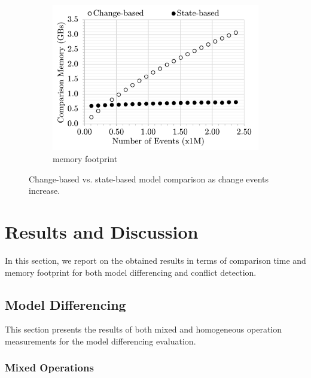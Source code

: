 \begin{figure}
\begin{subfigure}[t]{0.33\linewidth}
        \includegraphics[width=\linewidth]{mixed-memory-events}
        \caption{memory footprint}
        \label{fig:memory_diffs}
    \end{subfigure}
    \caption{Change-based vs. state-based model comparison as change events increase.}
    \label{fig:change_vs_state}
\end{figure}

\vspace{-5pt}
\section{Results and Discussion}
\label{sec:discussion}
In this section, we report on the obtained results in terms of comparison time and memory footprint for both model differencing and conflict detection. 


\subsection{Model Differencing}
\label{sec:differencing_results}
This section presents the results of both mixed and homogeneous operation measurements for the model differencing evaluation. 

\vspace{-5pt}
\subsubsection{Mixed Operations} \label{sec:mixed-operation}


